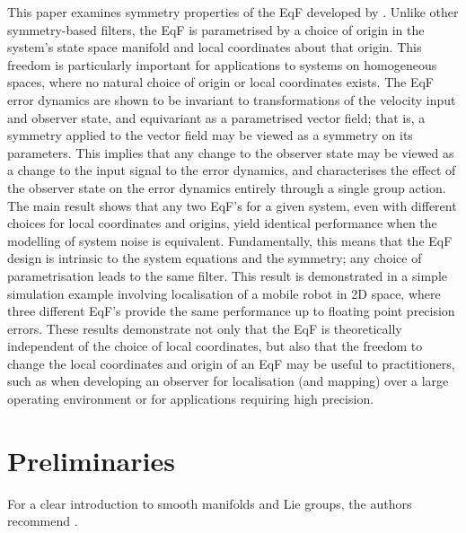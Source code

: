 \documentclass{article}
\begin{document}
This paper examines symmetry properties of the EqF developed by \cite{van2020equivariant}.
Unlike other symmetry-based filters, the EqF is parametrised by a choice of origin in the system's state space manifold and local coordinates about that origin.
This freedom is particularly important for applications to systems on homogeneous spaces, where no natural choice of origin or local coordinates exists.
The EqF error dynamics are shown to be invariant to transformations of the velocity input and observer state, and equivariant as a parametrised vector field; that is, a symmetry applied to the vector field may be viewed as a symmetry on its parameters.
This implies that any change to the observer state may be viewed as a change to the input signal to the error dynamics, and characterises the effect of the observer state on the error dynamics entirely through a single group action.
The main result shows that any two EqF's for a given system, even with different choices for local coordinates and origins, yield identical performance when the modelling of system noise is equivalent.
Fundamentally, this means that the EqF design is intrinsic to the system equations and the symmetry; any choice of parametrisation leads to the same filter. 
This result is demonstrated in a simple simulation example involving localisation of a mobile robot in 2D space, where three different EqF's provide the same performance up to floating point precision errors.
These results demonstrate not only that the EqF is theoretically independent of the choice of local coordinates, but also that the freedom to change the local coordinates and origin of an EqF may be useful to practitioners, such as when developing an observer for localisation (and mapping) over a large operating environment or for applications requiring high precision. 




\section{Preliminaries}

For a clear introduction to smooth manifolds and Lie groups, the authors recommend \cite{lee2013smooth}.
\end{document}

